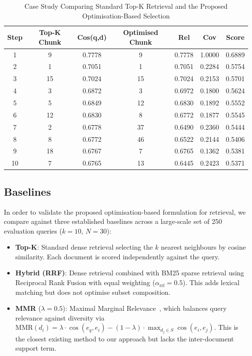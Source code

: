 \documentclass[conference]{IEEEtran}
\begin{document}
\vspace{10pt}
\begin{table}[!htbp]
\centering
\caption{Case Study Comparing Standard Top-K Retrieval and the Proposed Optimisation-Based Selection}
\label{tab:casestudy}
\begin{tabular}{ccccccc}
\toprule
\textbf{Step} & \textbf{Top-K Chunk} & \textbf{Cos(q,d)} & \textbf{Optimised Chunk} & \textbf{Rel} & \textbf{Cov} & \textbf{Score} \\
\midrule
1  & 9  & 0.7778 & 9  & 0.7778 & 1.0000 & 0.6889 \\
2  & 1  & 0.7051 & 1  & 0.7051 & 0.2284 & 0.5754 \\
3  & 15 & 0.7024 & 15 & 0.7024 & 0.2153 & 0.5701 \\
4  & 3  & 0.6872 & 3  & 0.6972 & 0.1800 & 0.5624 \\
5  & 5  & 0.6849 & 12 & 0.6830 & 0.1892 & 0.5552 \\
6  & 12 & 0.6830 & 8  & 0.6772 & 0.1877 & 0.5545 \\
7  & 2  & 0.6778 & 37 & 0.6490 & 0.2360 & 0.5444 \\
8  & 8  & 0.6772 & 46 & 0.6522 & 0.2144 & 0.5406 \\
9  & 18 & 0.6767 & 7  & 0.6765 & 0.1362 & 0.5381 \\
10 & 7  & 0.6765 & 13 & 0.6445 & 0.2423 & 0.5371 \\
\bottomrule
\end{tabular}
\end{table}

\subsection{Baselines}

In order to validate the proposed optimisation-based formulation for retrieval, we compare against three established baselines across a large-scale set of 250 evaluation queries ($k{=}10$, $N{=}30$):

\begin{itemize}
  \item \textbf{Top-K}: Standard dense retrieval selecting the $k$ nearest neighbours by cosine similarity. Each document is scored independently against the query.
  \item \textbf{Hybrid (RRF)}: Dense retrieval combined with BM25 sparse retrieval using Reciprocal Rank Fusion with equal weighting ($\alpha_{\mathrm{rrf}}{=}0.5$). This adds lexical matching but does not optimise subset composition.
  \item \textbf{MMR} ($\lambda{=}0.5$): Maximal Marginal Relevance~\cite{10}, which balances query relevance against diversity via $\mathrm{MMR}(d_i) = \lambda \cdot \cos(e_q, e_i) - (1{-}\lambda) \cdot \max_{d_j \in S} \cos(e_i, e_j)$. This is the closest existing method to our approach but lacks the inter-document support term.
\end{itemize}
\end{document}
